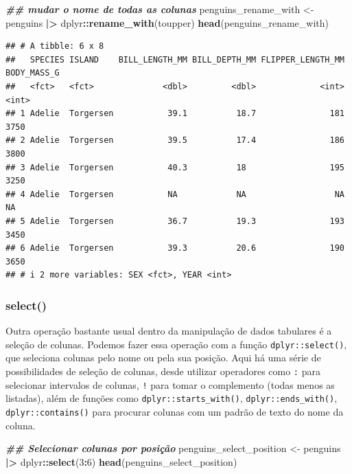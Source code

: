 \documentclass[
]{article}
\newenvironment{Shaded}{\begin{snugshade}}{\end{snugshade}}
\newcommand{\DecValTok}[1]{\textcolor[rgb]{0.00,0.00,0.81}{#1}}
\newcommand{\DocumentationTok}[1]{\textcolor[rgb]{0.56,0.35,0.01}{\textbf{\textit{#1}}}}
\newcommand{\FunctionTok}[1]{\textcolor[rgb]{0.13,0.29,0.53}{\textbf{#1}}}
\newcommand{\NormalTok}[1]{#1}
\newcommand{\OtherTok}[1]{\textcolor[rgb]{0.56,0.35,0.01}{#1}}
\newcommand{\SpecialCharTok}[1]{\textcolor[rgb]{0.81,0.36,0.00}{\textbf{#1}}}
\begin{document}
\begin{Shaded}
\begin{Highlighting}[]
\DocumentationTok{\#\# mudar o nome de todas as colunas}
\NormalTok{penguins\_rename\_with }\OtherTok{\textless{}{-}}\NormalTok{ penguins }\SpecialCharTok{|\textgreater{}} 
\NormalTok{    dplyr}\SpecialCharTok{::}\FunctionTok{rename\_with}\NormalTok{(toupper)}
\FunctionTok{head}\NormalTok{(penguins\_rename\_with)}
\end{Highlighting}
\end{Shaded}

\begin{verbatim}
## # A tibble: 6 x 8
##   SPECIES ISLAND    BILL_LENGTH_MM BILL_DEPTH_MM FLIPPER_LENGTH_MM BODY_MASS_G
##   <fct>   <fct>              <dbl>         <dbl>             <int>       <int>
## 1 Adelie  Torgersen           39.1          18.7               181        3750
## 2 Adelie  Torgersen           39.5          17.4               186        3800
## 3 Adelie  Torgersen           40.3          18                 195        3250
## 4 Adelie  Torgersen           NA            NA                  NA          NA
## 5 Adelie  Torgersen           36.7          19.3               193        3450
## 6 Adelie  Torgersen           39.3          20.6               190        3650
## # i 2 more variables: SEX <fct>, YEAR <int>
\end{verbatim}

\hypertarget{select}{%
\subsubsection{select()}\label{select}}

Outra operação bastante usual dentro da manipulação de dados tabulares é a seleção de colunas. Podemos fazer essa operação com a função \texttt{dplyr::select()}, que seleciona colunas pelo nome ou pela sua posição. Aqui há uma série de possibilidades de seleção de colunas, desde utilizar operadores como \texttt{:} para selecionar intervalos de colunas, \texttt{!} para tomar o complemento (todas menos as listadas), além de funções como \texttt{dplyr::starts\_with()}, \texttt{dplyr::ends\_with()}, \texttt{dplyr::contains()} para procurar colunas com um padrão de texto do nome da coluna.

\begin{Shaded}
\begin{Highlighting}[]
\DocumentationTok{\#\# Selecionar colunas por posição}
\NormalTok{penguins\_select\_position }\OtherTok{\textless{}{-}}\NormalTok{ penguins }\SpecialCharTok{|\textgreater{}} 
\NormalTok{    dplyr}\SpecialCharTok{::}\FunctionTok{select}\NormalTok{(}\DecValTok{3}\SpecialCharTok{:}\DecValTok{6}\NormalTok{)}
\FunctionTok{head}\NormalTok{(penguins\_select\_position)}
\end{Highlighting}
\end{Shaded}
\end{document}
